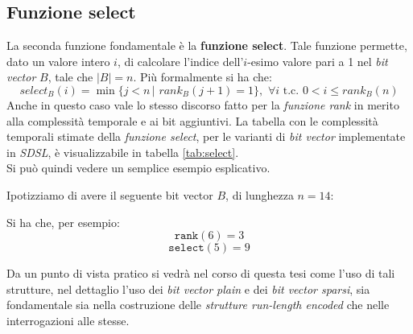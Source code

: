 \subsection{Funzione select}
La seconda funzione fondamentale è la \textbf{funzione select}. Tale funzione
permette, dato un valore intero $i$, di calcolare l'indice dell'$i$-esimo valore
pari a 1 nel \textit{bit vector} $B$, tale che $|B|=n$. Più formalmente si ha
che:
\[select_B(i)=\min\{j < n\,|\,\,rank_B(j+1)=1\},\,\,\forall i \mbox{ t.c. }
  0<i\leq rank_B(n)\]
Anche in questo caso vale lo stesso discorso fatto per la \textit{funzione rank}
in merito alla complessità temporale e ai bit aggiuntivi. La tabella con le
complessità temporali stimate della \textit{funzione select}, 
per le varianti di \textit{bit vector} implementate in \textit{SDSL}, è
visualizzabile in tabella \ref{tab:select}.\\
Si può quindi vedere un semplice esempio esplicativo.
\begin{esempio}
  Ipotizziamo di avere il seguente bit vector $B$, di lunghezza $n=14$:
  \begin{center}
  \end{center}
  Si ha che, per esempio:
  \[\mathtt{rank}(6)=3\]
  \[\mathtt{select}(5) =9\]
\end{esempio}
Da un punto di vista pratico si vedrà nel corso di questa tesi come l'uso di
tali strutture, nel dettaglio l'uso dei \textit{bit vector plain} e dei
\textit{bit vector sparsi}, sia fondamentale sia nella costruzione delle
\textit{strutture run-length encoded} che nelle interrogazioni alle stesse.